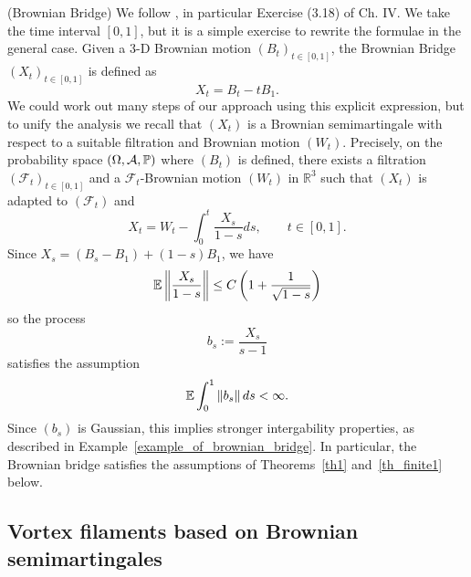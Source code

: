 \begin{example}
(Brownian Bridge) We follow \cite{R-Y}, in particular Exercise (3.18) of Ch.
IV. We take the time interval $\left[ 0,1\right] $, but it is a simple
exercise to rewrite the formulae in the general case. Given a $3$-D Brownian
motion $\left( B_{t}\right) _{t\in \left[ 0,1\right] }$, the Brownian Bridge 
$\left( X_{t} \right) _{t\in \left[ 0,1\right] }$ 
is defined as 
\begin{equation*}
X_{t} = B_{t}-tB_{1}.
\end{equation*}
We could work out many steps of our approach using this explicit expression,
but to unify the analysis we recall that $\left( X_{t} \right) $ is a
Brownian semimartingale with respect to a suitable filtration and Brownian
motion $\left( W_{t}\right) $. Precisely, on the probability space
$(\Omega, \mathcal{A}, \operatorname{{\mathbb P}})$ where $(B_t)$ is defined, there exists a
filtration $(\mathcal{F}_t)_{t\in [0,1]}$ and a $\mathcal{F}_t$-Brownian motion
$(W_t)$ in $\mathbb{R}^3$ such that $(X_t)$ is adapted to
$(\mathcal{F}_t)$ and 
\begin{equation*}
X_{t} =W_{t}-\int_{0}^{t}\frac{X_{s}}{1-s}ds, 
\qquad t\in %
\left[ 0,1 \right] .
\end{equation*}
Since $X_{s} = \left( B_{s}-B_{1}\right) +\left(
1-s\right) B_{1}$, we have
\begin{equation*}
\operatorname{{\mathbb E}} \left\| \frac{X_{s}}{1-s}\right\| 
\leq C\left( 1+\frac{1}{\sqrt{1-s}}\right) 
\end{equation*}
so the process 
\begin{equation*}
b_{s}:=\frac{X_{s}}{s-1}
\end{equation*}
satisfies the assumption
\begin{equation*}
\operatorname{{\mathbb E}} \int_{0}^{1}\left\| b_{s}\right\| ds <\infty
.
\end{equation*}
Since $(b_s)$ is Gaussian, this implies stronger intergability
properties, as described in Example~\ref{example_of_brownian_bridge}. 
In particular, the Brownian
bridge satisfies the assumptions of Theorems~\ref{th1} and~\ref{th_finite1} below.

\end{example}

\subsection{Vortex filaments based on Brownian semimartingales}


